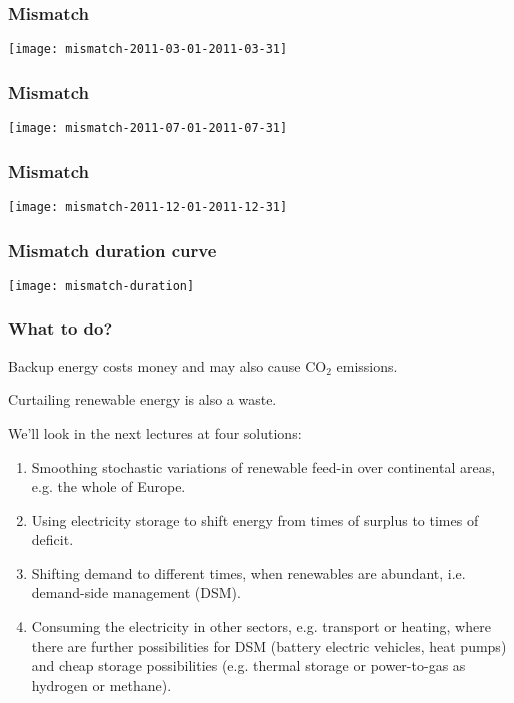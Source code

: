 \documentclass[10pt,aspectratio=169,dvipsnames]{beamer}
\let\olditem\item
\renewcommand{\item}{%
\olditem\vspace{5pt}}
\begin{document}
\begin{frame}
  \frametitle{Mismatch}


  \centering
  \texttt{[image: mismatch-2011-03-01-2011-03-31]}


\end{frame}

\begin{frame}
  \frametitle{Mismatch}


  \centering
  \texttt{[image: mismatch-2011-07-01-2011-07-31]}


\end{frame}

\begin{frame}
  \frametitle{Mismatch}


  \centering
  \texttt{[image: mismatch-2011-12-01-2011-12-31]}


\end{frame}



\begin{frame}
  \frametitle{Mismatch duration curve}


  \centering
  \texttt{[image: mismatch-duration]}


\end{frame}



\begin{frame}
  \frametitle{What to do?}

  Backup energy costs money and may also cause CO${}_2$ emissions.

  Curtailing renewable energy is also a waste.

  We'll look in the next lectures at \alert{four solutions}:
  \begin{enumerate}
  \item \alert{Smoothing} stochastic variations of renewable feed-in \alert{over continental areas}, e.g. the whole of Europe.
  \item Using \alert{electricity storage} to shift energy from times of surplus to times of deficit.
  \item Shifting demand to different times, when renewables are abundant, i.e. \alert{demand-side management} (DSM).
    \item Consuming the electricity in \alert{other sectors}, e.g. transport or heating, where there are further possibilities for DSM (battery electric vehicles, heat pumps)  and cheap storage possibilities (e.g. thermal storage or power-to-gas as hydrogen or methane).
  \end{enumerate}



\end{frame}
\end{document}
